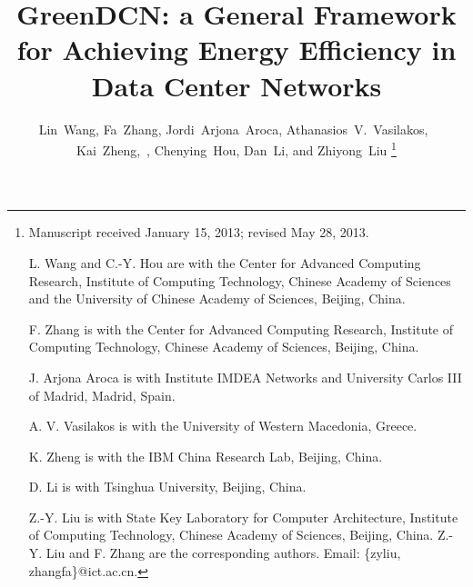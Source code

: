 \documentclass[journal,single-space,two column,twoside,10pt]{IEEEtran}
\begin{document}
\title{GreenDCN: a General Framework for Achieving Energy Efficiency in Data Center Networks}


\author{
Lin~Wang, Fa~Zhang, Jordi~Arjona~Aroca, Athanasios~V.~Vasilakos,~\\ 
Kai~Zheng,~, Chenying~Hou, Dan~Li, and Zhiyong~Liu 
\thanks{
Manuscript received January 15, 2013; revised May 28, 2013.

L. Wang and C.-Y. Hou are with the Center for Advanced Computing Research, Institute of Computing Technology, Chinese Academy of Sciences and the University of Chinese Academy of Sciences, Beijing, China.

F. Zhang is with the Center for Advanced Computing Research, Institute of Computing Technology, Chinese Academy of Sciences, Beijing, China.

J. Arjona Aroca is with Institute IMDEA Networks and University Carlos III of Madrid, Madrid, Spain.

A. V. Vasilakos is with the University of Western Macedonia, Greece.

K. Zheng is with the IBM China Research Lab, Beijing, China.

D. Li is with Tsinghua University, Beijing, China.

Z.-Y. Liu is with State Key Laboratory for Computer Architecture, Institute of Computing Technology, Chinese Academy of Sciences, Beijing, China.  Z.-Y. Liu and F. Zhang are the corresponding authors. Email: \{zyliu, zhangfa\}@ict.ac.cn.
}}



\maketitle
\end{document}
